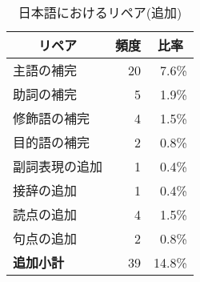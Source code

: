 \begin{table}[htbp]
    \leavevmode
\small
    \caption{日本語におけるリペア(追加)}
    \label{Table:Repairs_in_Japanese2}
    \vspace*{-3mm}
\begin {center}
\begin{tabular}{|l|r|r|}
\hline
\multicolumn{1}{|c|}{\bf リペア} & 
\multicolumn{1}{c|}{\bf 頻度} & 
\multicolumn{1}{c|}{\bf 比率} \\
\hline 
主語の補完                   & 20 &  7.6\% \\
助詞の補完                   &  5 &  1.9\% \\
修飾語の補完                 &  4 &  1.5\% \\
目的語の補完                 &  2 &  0.8\% \\
副詞表現の追加               &  1 &  0.4\% \\
接辞の追加                   &  1 &  0.4\% \\
\hline
読点の追加                   &  4 &  1.5\% \\
句点の追加                   &  2 &  0.8\% \\
\hline
{\bf 追加小計}               & 39 & 14.8\% \\
\hline
\end{tabular}
\end{center}
    \vspace*{-3mm}
\end{table}


